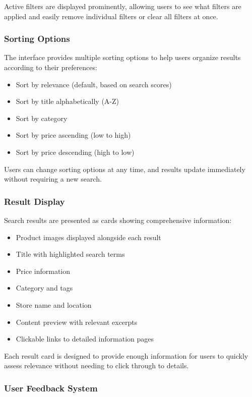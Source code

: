 \documentclass[11pt,a4paper]{article}
\begin{document}
Active filters are displayed prominently, allowing users to see what filters are applied and easily remove individual filters or clear all filters at once.

\subsubsection{Sorting Options}

The interface provides multiple sorting options to help users organize results according to their preferences:

\begin{itemize}
    \item Sort by relevance (default, based on search scores)
    \item Sort by title alphabetically (A-Z)
    \item Sort by category
    \item Sort by price ascending (low to high)
    \item Sort by price descending (high to low)
\end{itemize}

Users can change sorting options at any time, and results update immediately without requiring a new search.

\subsubsection{Result Display}

Search results are presented as cards showing comprehensive information:

\begin{itemize}
    \item Product images displayed alongside each result
    \item Title with highlighted search terms
    \item Price information
    \item Category and tags
    \item Store name and location
    \item Content preview with relevant excerpts
    \item Clickable links to detailed information pages
\end{itemize}

Each result card is designed to provide enough information for users to quickly assess relevance without needing to click through to details.

\subsubsection{User Feedback System}
\end{document}
